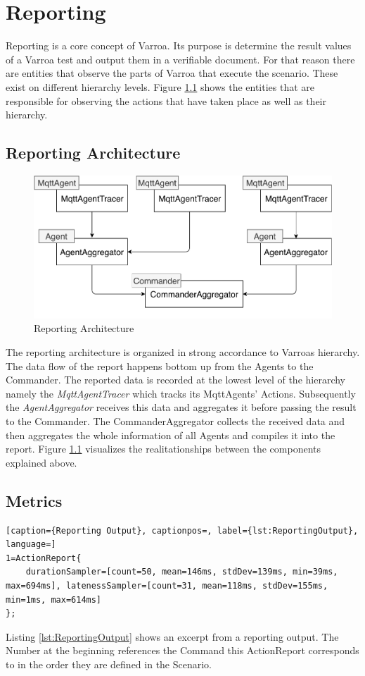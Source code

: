 \chapter{Reporting}\label{sec:Reporting}
Reporting is a core concept of Varroa.
Its purpose is determine the result values of a Varroa test and output them in a verifiable document.
For that reason there are entities that observe the parts of Varroa that execute the scenario.
These exist on different hierarchy levels.
Figure \ref{fig:ReportingArchitecture} shows the entities that are responsible for observing the actions that have taken place as well as their hierarchy.

\section{Reporting Architecture}
\begin{figure}[H]
	\begin{center}
		\includegraphics[scale=0.75]{Resources/PDF/ReportingArchitecture}
		\caption{Reporting Architecture}
		\label{fig:ReportingArchitecture}
	\end{center}
\end{figure}
The reporting architecture is organized in strong accordance to Varroas hierarchy.
The data flow of the report happens bottom up from the Agents to the Commander.
The reported data is recorded at the lowest level of the hierarchy namely the \emph{MqttAgentTracer} which tracks its MqttAgents' Actions.
Subsequently the \emph{AgentAggregator} receives this data and aggregates it before passing the result to the Commander.
The CommanderAggregator collects the received data 
and then aggregates the whole information of all Agents and compiles it into the report.
Figure \ref{fig:ReportingArchitecture} visualizes the realitationships between the components explained above.

\section{Metrics}
\begin{lstlisting}[caption={Reporting Output}, captionpos=, label={lst:ReportingOutput}, language=]
1=ActionReport{
	durationSampler=[count=50, mean=146ms, stdDev=139ms, min=39ms, max=694ms], latenessSampler=[count=31, mean=118ms, stdDev=155ms, min=1ms, max=614ms]
};
\end{lstlisting}
Listing \ref{lst:ReportingOutput} shows an excerpt from a reporting output.
The Number at the beginning references the Command this ActionReport corresponds to in the order they are defined in the Scenario.
